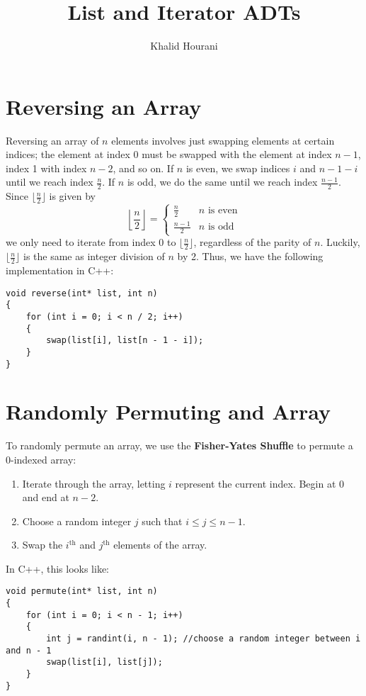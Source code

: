 \documentclass[a4paper]{article}
\title{List and Iterator ADTs}
\author{Khalid Hourani}
\begin{document}
\maketitle

\section{Reversing an Array}
Reversing an array of $n$ elements involves just swapping elements at certain indices; the element at index 0 must be swapped with the element at index $n-1$, index 1 with index $n-2$, and so on. If $n$ is even, we swap indices $i$ and $n - 1 - i$ until we reach index $\frac{n}{2}$. If $n$ is odd, we do the same until we reach index $\frac{n-1}{2}$. Since $\lfloor{\frac{n}{2}\rfloor}$ is given by  \[\left\lfloor{\frac{n}{2}}\right\rfloor=\begin{cases}\frac{n}{2} & n\text{ is even}\\\frac{n-1}{2} & n\text{ is odd}\end{cases}\] we only need to iterate from index 0 to $\lfloor{\frac{n}{2}\rfloor}$, regardless of the parity of $n$. Luckily, $\lfloor{\frac{n}{2}\rfloor}$ is the same as integer division of $n$ by 2. Thus, we have the following implementation in C++:
\begin{verbatim}
void reverse(int* list, int n)
{
	for (int i = 0; i < n / 2; i++)
	{
    	swap(list[i], list[n - 1 - i]);
	}
}
\end{verbatim}

\section{Randomly Permuting and Array}
To randomly permute an array, we use the \textbf{Fisher-Yates Shuffle} to permute a 0-indexed array: 
\begin{enumerate}
\item Iterate through the array, letting $i$ represent the current index. Begin at 0 and end at $n - 2$. 
\item Choose a random integer $j$ such that $i\leq j \leq n-1$.
\item Swap the $i^{\text{th}}$ and $j^{\text{th}}$ elements of the array. 
\end{enumerate}

In C++, this looks like:
\begin{verbatim}
void permute(int* list, int n)
{
	for (int i = 0; i < n - 1; i++)
	{
		int j = randint(i, n - 1); //choose a random integer between i and n - 1
		swap(list[i], list[j]);
	}
}
\end{verbatim}
\end{document}
